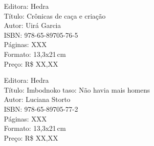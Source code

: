 \begin{ficha}
Editora: Hedra\\
Título: Crônicas de caça e criação\\
Autor:  Uirá Garcia\\ 
ISBN: 978-65-89705-76-5\\
Páginas: XXX\\
Formato: 13,3x21\,cm\\
Preço: R\$ XX,XX\\
\end{ficha}

\pagebreak


\noindent{}\lipsum[1]

\begin{ficha}
Editora: Hedra\\
Título: Imbodnoko taso: Não havia mais homens\\
Autor:  Luciana Storto\\ 
ISBN: 978-65-89705-77-2\\
Páginas: XXX\\
Formato: 13,3x21\,cm\\
Preço: R\$ XX,XX\\
\end{ficha}

\pagebreak
\pagestyle{hedracat}

